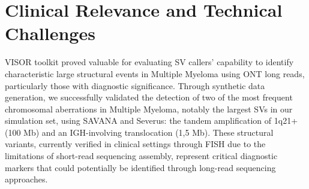 

\section{Clinical Relevance and Technical Challenges}

VISOR toolkit proved valuable for evaluating SV callers' capability to identify 
characteristic large structural events in Multiple Myeloma using ONT long reads, 
particularly those with diagnostic significance. Through synthetic data 
generation, we successfully validated the detection of two of the most frequent 
chromosomal aberrations in Multiple Myeloma, notably the largest SVs in our 
simulation set, using SAVANA and Severus: the tandem amplification of 1q21+ 
(100 Mb) and an IGH-involving translocation (1,5 Mb). These structural variants, 
currently verified in clinical settings through FISH due to the limitations of 
short-read sequencing assembly, represent critical diagnostic markers that could 
potentially be identified through long-read sequencing approaches.

